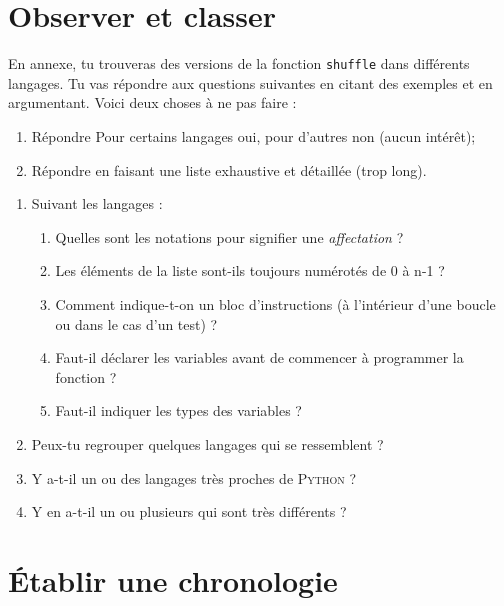 \documentclass[a4paper,12pt]{book}
\begin{document}
\section{Observer et classer}
En annexe, tu trouveras des versions de la fonction \texttt{shuffle} dans différents langages. Tu vas répondre aux questions suivantes en citant des exemples et en argumentant. Voici deux choses à ne pas faire :
\begin{enumerate}[--]
	\item Répondre \og Pour certains langages oui, pour d'autres non\fg{} (aucun intérêt);
    \item Répondre en faisant une liste exhaustive et détaillée (trop long).
\end{enumerate}
\begin{enumerate}[\bfseries 1.]
	\item Suivant les langages :
	\begin{enumerate}[\bfseries a.]
		\item 	Quelles sont les notations pour signifier une \textit{affectation} ?\bareme{1pt}
		\item 	Les éléments de la liste sont-ils toujours numérotés de 0 à n-1 ?\bareme{1pt}
		\item 	Comment indique-t-on un bloc d'instructions (à l'intérieur d'une boucle ou dans le cas d'un test) ?\bareme{1pt}
		\item 	Faut-il déclarer les variables  avant de commencer à programmer la fonction ?\bareme{1pt}
		\item 	Faut-il indiquer les types des variables ?\bareme{1pt}
	\end{enumerate}
	
	\item	Peux-tu regrouper quelques langages qui se ressemblent ?\bareme{1pt}
	\item 	Y a-t-il un ou des langages très proches de \textsc{Python} ?
	\item 	Y en a-t-il un ou plusieurs qui sont très différents ?
\end{enumerate}

\section{\'Etablir une chronologie}
	
\end{document}
